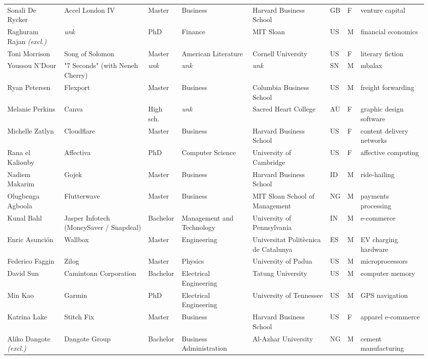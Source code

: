 \documentclass[11pt]{article}
\begin{document}
\begin{longtable}{@{}p{2.4cm}p{2.5cm}p{1.35cm}p{1.9cm}p{2.1cm}p{0.5cm}p{0.45cm}p{2.2cm}@{}}
Sonali De Rycker & Accel London IV & Master & Business & Harvard Business School & GB & F & venture capital \\
Raghuram Rajan \textit{\scriptsize(excl.)} & \textit{unk} & PhD & Finance & MIT Sloan & US & M & financial economics \\
Toni Morrison & Song of Solomon & Master & American Literature & Cornell University & US & F & literary fiction \\
Youssou N'Dour & "7 Seconds" (with Neneh Cherry) & \textit{unk} & \textit{unk} & \textit{unk} & SN & M & mbalax \\
Ryan Petersen & Flexport & Master & Business & Columbia Business School & US & M & freight forwarding \\
Melanie Perkins & Canva & High sch. & \textit{unk} & Sacred Heart College & AU & F & graphic design software \\
Michelle Zatlyn & Cloudflare & Master & Business & Harvard Business School & US & F & content delivery networks \\
Rana el Kaliouby & Affectiva & PhD & Computer Science & University of Cambridge & US & F & affective computing \\
Nadiem Makarim & Gojek & Master & Business & Harvard Business School & ID & M & ride-hailing \\
Olugbenga Agboola & Flutterwave & Master & Business & MIT Sloan School of Management & NG & M & payments processing \\
Kunal Bahl & Jasper Infotech (MoneySaver / Snapdeal) & Bachelor & Management and Technology & University of Pennsylvania & IN & M & e-commerce \\
Enric Asunción & Wallbox & Master & Engineering & Universitat Politècnica de Catalunya & ES & M & EV charging hardware \\
Federico Faggin & Zilog & Master & Physics & University of Padua & US & M & microprocessors \\
David Sun & Camintonn Corporation & Bachelor & Electrical Engineering & Tatung University & US & M & computer memory \\
Min Kao & Garmin & PhD & Electrical Engineering & University of Tennessee & US & M & GPS navigation \\
Katrina Lake & Stitch Fix & Master & Business & Harvard Business School & US & F & apparel e-commerce \\
Aliko Dangote \textit{\scriptsize(excl.)} & Dangote Group & Bachelor & Business Administration & Al-Azhar University & NG & M & cement manufacturing \\

\end{longtable}
\end{document}
